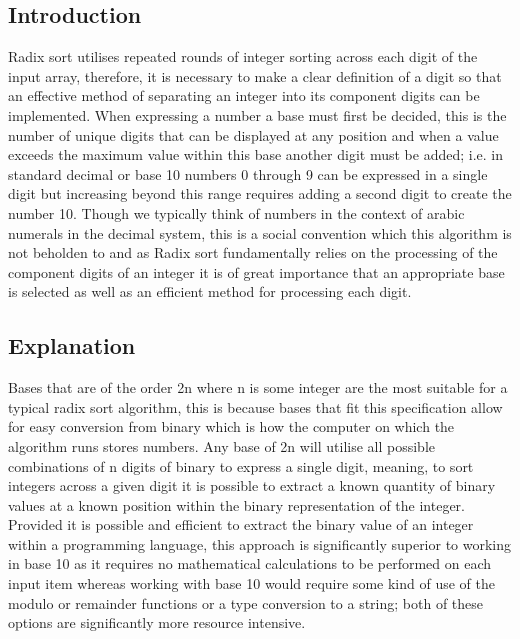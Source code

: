 \documentclass[12pt]{article}
\begin{document}
	\subsection{Introduction}
	Radix sort utilises repeated rounds of integer sorting across each digit of the input array, therefore, it is necessary to make a clear definition of a digit so that an effective method of separating an integer into its component digits can be implemented. When expressing a number a base must first be decided, this is the number of unique digits that can be displayed at any position and when a value exceeds the maximum value within this base another digit must be added; i.e. in standard decimal or base 10 numbers 0 through 9 can be expressed in a single digit but increasing beyond this range requires adding a second digit to create the number 10. Though we typically think of numbers in the context of arabic numerals in the decimal system, this is a social convention which this algorithm is not beholden to and as Radix sort fundamentally relies on the processing of the component digits of an integer it is of great importance that an appropriate base is selected as well as an efficient method for processing each digit.
	\subsection{Explanation}
	Bases that are of the order 2n where n is some integer are the most suitable for a typical radix sort algorithm, this is because bases that fit this specification allow for easy conversion from binary which is how the computer on which the algorithm runs stores numbers. Any base of 2n will utilise all possible combinations of n digits of binary to express a single digit, meaning, to sort integers across a given digit it is possible to extract a known quantity of binary values at a known position within the binary representation of the integer. Provided it is possible and efficient to extract the binary value of an integer within a programming language, this approach is significantly superior to working in base 10 as it requires no mathematical calculations to be performed on each input item whereas working with base 10 would require some kind of use of the modulo or remainder functions or a type conversion to a string; both of these options are significantly more resource intensive.
\end{document}
